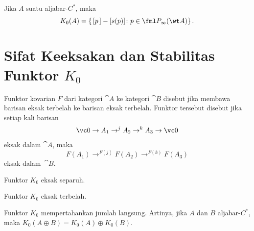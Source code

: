 \begin{prop}\label{0062544} Jika $A$ suatu
aljabar-$C^*$,
maka
     \[ K_0(A) = \{\,[p\,] - [s(p)]\colon p \in \fml P_\infty(\wt A)\}\,. \] %
\end{prop}























\section{Sifat Keeksakan dan Stabilitas Funktor $K_0$}
\begin{defn} Funktor kovarian $F$ dari kategori $\cat A$ ke kategori $\cat B$ disebut
 jika membawa barisan eksak terbelah ke barisan eksak terbelah. Funktor tersebut disebut
 jika setiap kali barisan
   \[ \vc 0 \to A_1 \to^j A_2 \to^k A_3 \to \vc 0 \]
eksak dalam $\cat A$, maka
   \[ F(A_1) \to^{F(j)} F(A_2) \to^{F(k)} F(A_3) \]
eksak dalam~$\cat B$.
\end{defn}

\begin{prop}\label{0062664} Funktor $K_0$ eksak separuh.
\end{prop}


\begin{prop}\label{0062667} Funktor $K_0$ eksak terbelah.
\end{prop}


\begin{prop}\label{0062671} Funktor $K_0$ mempertahankan jumlah langsung. Artinya, jika $A$ dan $B$
aljabar-$C^*$, maka $K_0(A \oplus B) = K_0(A) \oplus K_0(B)$.
\end{prop}

